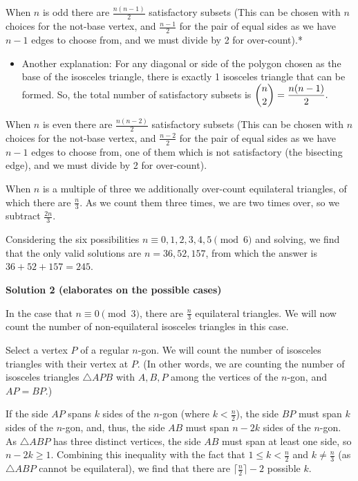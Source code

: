 \begin{enumerate}
 When $n$ is odd there are $\frac{n(n-1)}{2}$ satisfactory subsets (This can be chosen with $n$ choices for the not-base vertex, and $\frac{n-1}{2}$ for the pair of equal sides as we have $n-1$ edges to choose from, and we must divide by 2 for over-count).*

 
            \begin{itemize}
        \item Another explanation: For any diagonal or side of the polygon chosen as the base of the isosceles triangle, there is exactly 1 isosceles triangle that can be formed. So, the total number of satisfactory subsets is $\dbinom{n}{2}=\dfrac{n(n-1)}{2}.$
            \end{itemize}
            When $n$ is even there are $\frac{n(n-2)}{2}$ satisfactory subsets (This can be chosen with $n$ choices for the not-base vertex, and $\frac{n-2}{2}$ for the pair of equal sides as we have $n-1$ edges to choose from, one of them which is not satisfactory (the bisecting edge), and we must divide by 2 for over-count).

 When $n$ is a multiple of three we additionally over-count equilateral triangles, of which there are $\frac{n}{3}$. As we count them three times, we are two times over, so we subtract $\frac{2n}{3}$.

 Considering the six possibilities $n \equiv 0,1,2,3,4,5 \pmod{6}$ and solving, we find that the only valid solutions are $n = 36, 52, 157$, from which the answer is $36 + 52 + 157 = \boxed{245}$.

 



\textbf{Solution 2 (elaborates on the possible cases)}

In the case that $n\equiv 0\pmod 3$, there are $\frac{n}{3}$ equilateral triangles. We will now count the number of non-equilateral isosceles triangles in this case.

 Select a vertex $P$ of a regular $n$-gon. We will count the number of isosceles triangles with their vertex at $P$. (In other words, we are counting the number of isosceles triangles $\triangle APB$ with $A, B, P$ among the vertices of the $n$-gon, and $AP=BP$.)

 If the side $AP$ spans $k$ sides of the $n$-gon (where $k<\frac{n}{2}$), the side $BP$ must span $k$ sides of the $n$-gon, and, thus, the side $AB$ must span $n-2k$ sides of the $n$-gon. As $\triangle ABP$ has three distinct vertices, the side $AB$ must span at least one side, so $n-2k \ge 1$. Combining this inequality with the fact that $1\le k<\frac{n}{2}$ and $k\not = \frac{n}{3}$ (as $\triangle ABP$ cannot be equilateral), we find that there are $\lceil\frac{n}{2}\rceil-2$ possible $k$. 


\end{enumerate}
